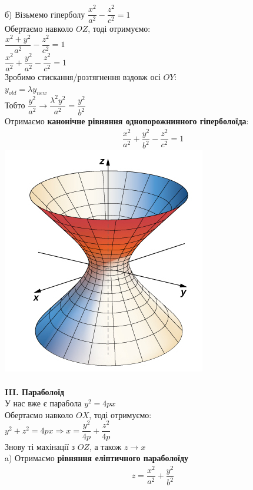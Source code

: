 \documentclass[a4paper, 14pt]{extarticle}
\def\bigline{\vspace{5mm}\\}
\begin{document}
б) Візьмемо гіперболу $\dfrac{x^2}{a^2} - \dfrac{z^2}{c^2} = 1$\\
Обертаємо навколо $OZ$, тоді отримуємо:\\
$\dfrac{x^2+y^2}{a^2} - \dfrac{z^2}{c^2} = 1$\\
$\dfrac{x^2}{a^2} + \dfrac{y^2}{a^2} - \dfrac{z^2}{c^2} = 1$\\
Зробимо стискання/розтягнення вздовж осі $OY$:\\
$y_{old} = \lambda y_{new}$\\
Тобто $\dfrac{y^2}{a^2} \to \dfrac{\lambda^2 y^2}{a^2} = \dfrac{y^2}{b^2}$\\
Отримаємо \textbf{канонічне рівняння однопорожнинного гіперболоїда}:
\begin{align*}
\dfrac{x^2}{a^2} + \dfrac{y^2}{b^2} - \dfrac{z^2}{c^2} = 1
\end{align*}
\includegraphics[scale=1]{1-shit-hyperboloid.jpeg}
\bigline
\\
\textbf{III. Параболоїд}\\
У нас вже є парабола $y^2 = 4px$\\
Обертаємо навколо $OX$, тоді отримуємо:\\
$y^2+z^2 = 4px \Rightarrow x = \dfrac{y^2}{4p} + \dfrac{z^2}{4p}$\\
Знову ті махінації з $OZ$, а також $z \to x$\\
a) Отримаємо \textbf{рівняння еліптичного параболоїду}
\begin{align*}
z = \dfrac{x^2}{a^2} + \dfrac{y^2}{b^2}
\end{align*}
\end{document}
